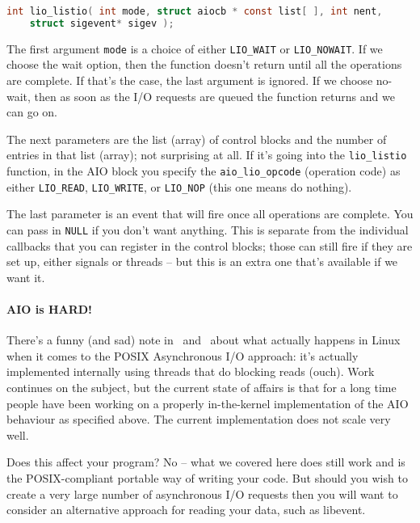 \begin{lstlisting}[language=C]
int lio_listio( int mode, struct aiocb * const list[ ], int nent, 
    struct sigevent* sigev );
\end{lstlisting}

The first argument \texttt{mode} is a choice of either \texttt{LIO\_WAIT} or \texttt{LIO\_NOWAIT}. If we choose the wait option, then the function doesn't return until all the operations are complete. If that's the case, the last argument is ignored. If we choose no-wait, then as soon as the I/O requests are queued the function returns and we can go on.

The next parameters are the list (array) of control blocks and the number of entries in that list (array); not surprising at all. If it's going into the \texttt{lio\_listio} function, in the AIO block you specify the \texttt{aio\_lio\_opcode} (operation code) as either \texttt{LIO\_READ}, \texttt{LIO\_WRITE}, or \texttt{LIO\_NOP} (this one means do nothing).

The last parameter is an event that will fire once all operations are complete. You can pass in \texttt{NULL} if you don't want anything. This is separate from the individual callbacks that you can register in the control blocks; those can still fire if they are set up, either signals or threads -- but this is an extra one that's available if we want it.

\paragraph{AIO is HARD!}
There's a funny (and sad) note in~\cite{lpi} and~\cite{linuxaio} about what actually happens in Linux when it comes to the POSIX Asynchronous I/O approach: it's actually implemented internally using threads that do blocking reads (ouch). Work continues on the subject, but the current state of affairs is that for a long time people have been working on a properly in-the-kernel implementation of the AIO behaviour as specified above. The current implementation does not scale very well.

Does this affect your program? No -- what we covered here does still work and is the POSIX-compliant portable way of writing your code. But should you wish to create a very large number of asynchronous I/O requests then you will want to consider an alternative approach for reading your data, such as libevent.




